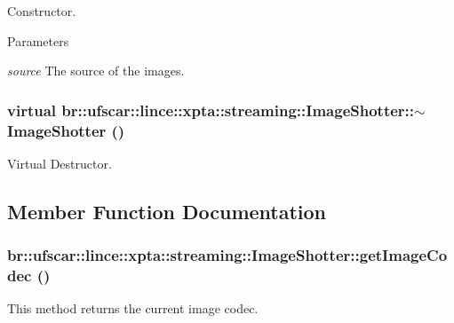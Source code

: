 Constructor. 


\begin{DoxyParams}{Parameters}
\item[{\em source}]The source of the images. \end{DoxyParams}
\hypertarget{classbr_1_1ufscar_1_1lince_1_1xpta_1_1streaming_1_1ImageShotter_aea554a4e9db247c2179bfd3663d7a728}{
\subsubsection[{$\sim$ImageShotter}]{\setlength{\rightskip}{0pt plus 5cm}virtual br::ufscar::lince::xpta::streaming::ImageShotter::$\sim$ImageShotter ()}}
\label{classbr_1_1ufscar_1_1lince_1_1xpta_1_1streaming_1_1ImageShotter_aea554a4e9db247c2179bfd3663d7a728}


Virtual Destructor. 



\subsection{Member Function Documentation}
\hypertarget{classbr_1_1ufscar_1_1lince_1_1xpta_1_1streaming_1_1ImageShotter_ab22098b501aacf71e98ec633b0372977}{
\subsubsection[{getImageCodec}]{ br::ufscar::lince::xpta::streaming::ImageShotter::getImageCodec ()}}
\label{classbr_1_1ufscar_1_1lince_1_1xpta_1_1streaming_1_1ImageShotter_ab22098b501aacf71e98ec633b0372977}


This method returns the current image codec. 

